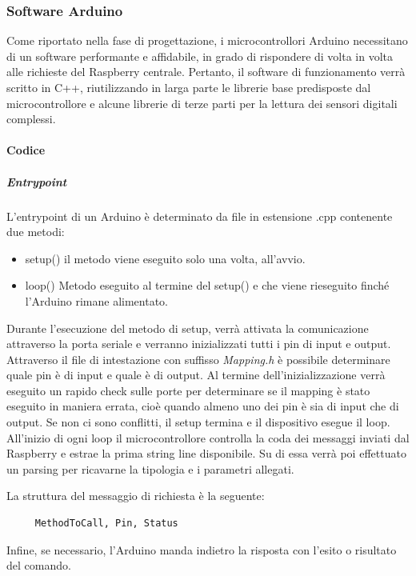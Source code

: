 \documentclass[12pt]{article}
\begin{document}
\subsubsection{Software Arduino}
Come riportato nella fase di progettazione, i microcontrollori Arduino necessitano di un software performante e affidabile, in grado di rispondere di volta in volta alle richieste del Raspberry centrale. Pertanto, il software di funzionamento verrà scritto in C++, riutilizzando in larga parte le librerie base predisposte dal microcontrollore e alcune librerie di terze parti per la lettura dei sensori digitali complessi.
\paragraph{Codice}
\subparagraph{Entrypoint}
L'entrypoint di un Arduino è determinato da file in estensione .cpp contenente due metodi:
\begin{itemize}
\item setup() il metodo viene eseguito solo una volta, all'avvio.
\item loop() Metodo eseguito al termine del setup() e che viene rieseguito finché l'Arduino rimane alimentato.
\end{itemize}
Durante l'esecuzione del metodo di setup, verrà attivata la comunicazione attraverso la porta seriale e verranno inizializzati tutti i pin di input e output. Attraverso il file di intestazione con suffisso \textit{Mapping.h} è possibile determinare quale pin è di input e quale è di output.
Al termine dell'inizializzazione verrà eseguito un rapido check sulle porte per determinare se il mapping è stato eseguito in maniera errata, cioè quando almeno uno dei pin è sia di input che di output.
Se non ci sono conflitti, il setup termina e il dispositivo esegue il loop.\\
All'inizio di ogni loop il microcontrollore controlla la coda dei messaggi inviati dal Raspberry e estrae la prima string line disponibile.
Su di essa verrà poi effettuato un parsing per ricavarne la tipologia e i parametri allegati.

La struttura del messaggio di richiesta è la seguente: 
\begin{lstlisting}
     MethodToCall, Pin, Status
\end{lstlisting}

Infine, se necessario, l'Arduino manda indietro la risposta con l'esito o risultato del comando.
\end{document}
